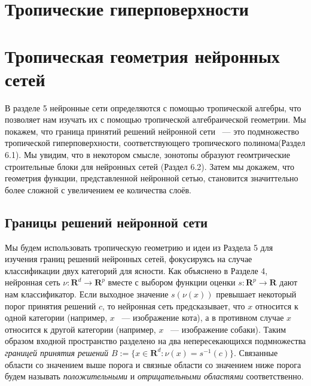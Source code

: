\documentclass[russian]{lecture-notes}
\begin{document}
	\section{Тропические гиперповерхности}
	
	

	\section{Тропическая геометрия нейронных сетей}
	
	В разделе 5 нейронные сети определяются с помощью тропической алгебры, что позволяет нам изучать их с помощью тропической алгебраической геометрии. Мы покажем, что граница принятий решений нейронной сети ~--- это подмножество тропической гиперповерхности, соответствующего тропического полинома(Раздел 6.1). Мы увидим, что в некотором смысле, зонотопы образуют геомтрические строительные блоки для нейронных сетей (Раздел 6.2). Затем мы докажем, что геометрия функции, представленной нейронной сетью, становится значиттельно более сложной с увеличением ее количества слоёв.
	\subsection{Границы решений нейронной сети}
	
	Мы будем использовать тропическую геометрию и идеи из Раздела 5 для изучения границ решений нейронных сетей, фокусируясь на случае классификации двух категорий для ясности. Как объяснено в Разделе 4, нейронная сеть $\nu : \mathbf{R}^d \rightarrow \mathbf{R}^p$ вместе с выбором функции оценки $s: \mathbf{R}^p \rightarrow \mathbf{R}$ дают нам классификатор. Если выходное значение $s(\nu(x))$ превышает некоторый порог принятия решений $c$, то нейронная сеть предсказывает, что $x$ относится к одной категории (например, $x$ ~--- изображение кота), а в противном случае $x$ относится к другой категории (например, $x$ ~--- изображение собаки). Таким образом входной пространство разделено на два непересекающихся подмножества \textit{границей принятия решений $B := \{x \in \mathbf{R}^d : \nu(x) = s^{-1}(c)\} $}. Связанные области со значением выше порога и связные области со значением ниже порога будем называть \textit{положительными} и \textit{отрицательными областями} соответственно.
	
\end{document}
